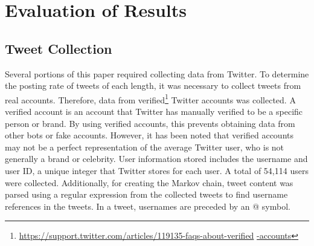 \section{Evaluation of Results}
\label{cha:evaluation}
\subsection{Tweet Collection}
\label{sec:methodology:data-collection}

Several portions of this paper required collecting data from Twitter.  To
determine the posting rate of tweets of each length, it was necessary to collect
tweets from real accounts.  Therefore, data from
verified\footnote{\url{https://support.twitter.com/articles/119135-faqs-about-verified}
\url{-accounts}}
Twitter accounts was collected.  A verified account is an account that Twitter
has manually verified to be a specific person or brand.  By using verified accounts, this
prevents obtaining data from other bots or fake accounts.  However, it has been
noted that verified accounts may not be a perfect representation of the average
Twitter user, who is not generally a brand or celebrity.  User information stored
includes the username and user ID, a unique integer that Twitter stores for
each user.  A total of 54,114 users were collected.  Additionally, for
creating the Markov chain, tweet content was parsed using a regular expression
from the collected tweets to find username references in the tweets.  In a
tweet, usernames are preceded by an @ symbol.

